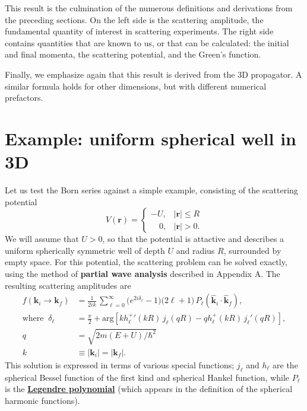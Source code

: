 \documentclass[pra,12pt]{revtex4}
\begin{document}
This result is the culmination of the numerous definitions and
derivations from the preceding sections.  On the left side is the
scattering amplitude, the fundamental quantity of interest in
scattering experiments.  The right side contains quantities that are
known to us, or that can be calculated: the initial and final momenta,
the scattering potential, and the Green's function.

Finally, we emphasize again that this result is derived from the 3D
propagator.  A similar formula holds for other dimensions, but with
different numerical prefactors.

\section{Example: uniform spherical well in 3D}

Let us test the Born series against a simple example, consisting of
the scattering potential
$$V(\mathbf{r}) = \begin{cases}-U, & |\mathbf{r}| \le R \\ \;\;\;\,0,
  & |\mathbf{r}| > 0. \end{cases}$$ We will assume that $U > 0$, so
that the potential is attactive and describes a uniform spherically
symmetric well of depth $U$ and radius $R$, surrounded by empty space.
For this potential, the scattering problem can be solved exactly,
using the method of \textbf{partial wave analysis} described in
Appendix A.  The resulting scattering amplitudes are
$$\begin{aligned}f(\mathbf{k}_i \rightarrow \mathbf{k}_f) &= \frac{1}{2ik}\, \sum_{\ell =0}^\infty \big(e^{2i\delta_\ell} - 1\big) \big(2\ell+1\big)\, P_{\ell}(\hat{\mathbf{k}}_i\cdot \hat{\mathbf{k}}_f), \\ \mathrm{where}\;\; \delta_\ell &= \frac{\pi}{2} + \mathrm{arg}\!\left[k {h_\ell^+}'(kR) \, j_\ell(qR) - qh_\ell^+(kR)\, j_\ell'(qR)\right], \\ q &= \sqrt{2m(E+U)/\hbar^2} \\ k &\equiv |\mathbf{k}_i| = |\mathbf{k}_f|.\end{aligned}$$
This solution is expressed in terms of various special functions;
$j_\ell$ and $h_\ell$ are the spherical Bessel function of the first
kind and spherical Hankel function, while $P_\ell$ is the
\href{https://en.wikipedia.org/wiki/Legendre_polynomials}{\textbf{Legendre
    polynomial}} (which appears in the definition of the spherical
harmonic functions).
\end{document}
